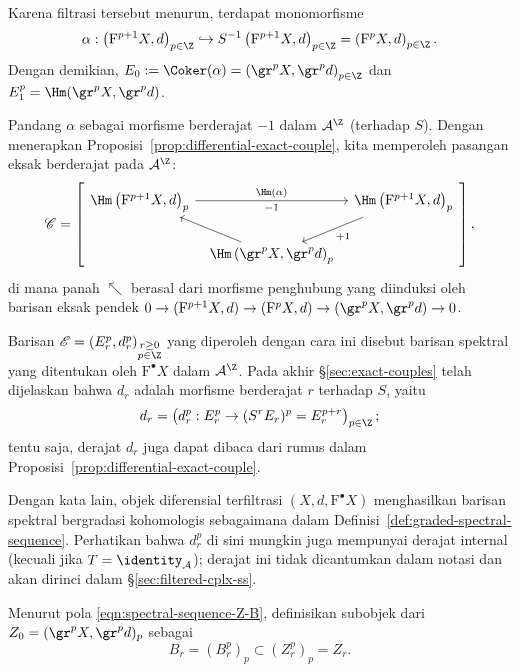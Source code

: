 Karena filtrasi tersebut menurun, terdapat monomorfisme
\[ \alpha:\left(\mathrm{F}^{p+1}X,d\right)_{p\in\Z}
	\hookrightarrow S^{-1}\left(\mathrm{F}^{p+1}X,d\right)_{p\in\Z}
	=\left(\mathrm{F}^{p}X,d\right)_{p\in\Z}. \]
Dengan demikian,
$E_0:=\Coker(\alpha)=\left(\gr^pX,\gr^pd\right)_{p\in\Z}$ dan
$E_1^p=\Hm(\gr^pX,\gr^pd)$.

Pandang $\alpha$ sebagai morfisme berderajat $-1$ dalam
$\mathcal{A}^{\Z}$ (terhadap $S$). Dengan menerapkan
Proposisi~\ref{prop:differential-exact-couple}, kita memperoleh pasangan eksak
berderajat pada $\mathcal{A}^{\Z}$:
\[\mathscr{C}=\left[\begin{tikzcd}[column sep=tiny]
	\Hm\left(\mathrm{F}^{p+1}X,d\right)_p
	\arrow[rr, "-1"', "{\Hm(\alpha)}"] & &
	\Hm\left(\mathrm{F}^{p+1}X,d\right)_p \arrow[ld, "{+1}"] \\
	& \Hm\left(\gr^pX,\gr^pd\right)_p \arrow[lu] &
\end{tikzcd}\right],\]
di mana panah $\nwarrow$ berasal dari morfisme penghubung yang diinduksi oleh
barisan eksak pendek
$0\to(\mathrm{F}^{p+1}X,d)\to(\mathrm{F}^pX,d)
\to(\gr^pX,\gr^pd)\to0$.

Barisan
$\mathscr{E}=(E_r^p,d_r^p)_{\substack{r\geq0\\p\in\Z}}$ yang diperoleh
dengan cara ini disebut barisan spektral yang ditentukan oleh
$\mathrm{F}^\bullet X$ dalam $\mathcal{A}^{\Z}$. Pada akhir
\S\ref{sec:exact-couples} telah dijelaskan bahwa $d_r$ adalah morfisme
berderajat $r$ terhadap $S$, yaitu
\[ d_r=\left(d_r^p:E_r^p\to(S^rE_r)^p=E_r^{p+r}\right)_{p\in\Z}; \]
tentu saja, derajat $d_r$ juga dapat dibaca dari rumus dalam
Proposisi~\ref{prop:differential-exact-couple}.

Dengan kata lain, objek diferensial terfiltrasi
$(X,d,\mathrm{F}^\bullet X)$ menghasilkan barisan spektral bergradasi
kohomologis sebagaimana dalam Definisi~\ref{def:graded-spectral-sequence}.
Perhatikan bahwa $d_r^p$ di sini mungkin juga mempunyai derajat internal
(kecuali jika $T=\identity_{\mathcal{A}}$); derajat ini tidak dicantumkan
dalam notasi dan akan dirinci dalam \S\ref{sec:filtered-cplx-ss}.

Menurut pola \eqref{eqn:spectral-sequence-Z-B}, definisikan subobjek dari
$Z_0=(\gr^pX,\gr^pd)_p$ sebagai
\[ B_r=(B_r^p)_p\subset(Z_r^p)_p=Z_r. \]

